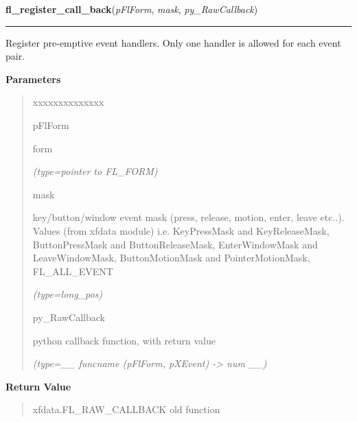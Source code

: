 \hspace{.8\funcindent}\begin{boxedminipage}{\funcwidth}

    \raggedright \textbf{fl\_register\_call\_back}(\textit{pFlForm}, \textit{mask}, \textit{py\_RawCallback})

    \vspace{-1.5ex}

    \rule{\textwidth}{0.5\fboxrule}
\setlength{\parskip}{2ex}
    Register pre-emptive event handlers. Only one handler is allowed for 
    each event pair.

\setlength{\parskip}{1ex}
      \textbf{Parameters}
      \vspace{-1ex}

      \begin{quote}
        \begin{Ventry}{xxxxxxxxxxxxxx}

          \item[pFlForm]

          form

            {\it (type=pointer to FL\_FORM)}

          \item[mask]

          key/button/window event mask (press, release, motion, enter, 
          leave etc..). Values (from xfdata module) i.e. KeyPressMask and 
          KeyReleaseMask, ButtonPressMask and ButtonReleaseMask, 
          EnterWindowMask and LeaveWindowMask, ButtonMotionMask and 
          PointerMotionMask, FL\_ALL\_EVENT

            {\it (type=long\_pos)}

          \item[py\_RawCallback]

          python callback function, with return value

            {\it (type=\_\_ funcname (pFlForm, pXEvent) -{\textgreater} num \_\_)}

        \end{Ventry}

      \end{quote}

      \textbf{Return Value}
    \vspace{-1ex}

      \begin{quote}
      xfdata.FL\_RAW\_CALLBACK old function

      \end{quote}


\end{boxedminipage}
